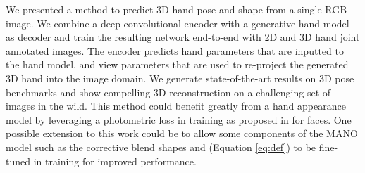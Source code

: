 \documentclass[10pt,twocolumn,letterpaper]{article}
\begin{document}
We presented a method to predict 3D hand pose and shape from a single RGB image. We combine a deep convolutional encoder with a generative hand model as decoder and train the resulting network end-to-end with 2D and 3D hand joint annotated images. The encoder predicts hand parameters that are inputted to the hand model, and view parameters that are used to re-project the generated 3D hand into the image domain. We generate state-of-the-art results on 3D pose benchmarks and show compelling 3D reconstruction on a challenging set of images in the wild. This method could benefit greatly from a hand appearance model by leveraging a photometric loss in training as proposed in \cite{tewari2017mofa,tewari2017self} for faces. 
One possible extension to this work could be to allow some components of the MANO \cite{romero2017embodied} model such as the corrective blend shapes  and  (Equation \ref{eq:def}) to be fine-tuned in training for improved performance.   

{\small


}
\end{document}
